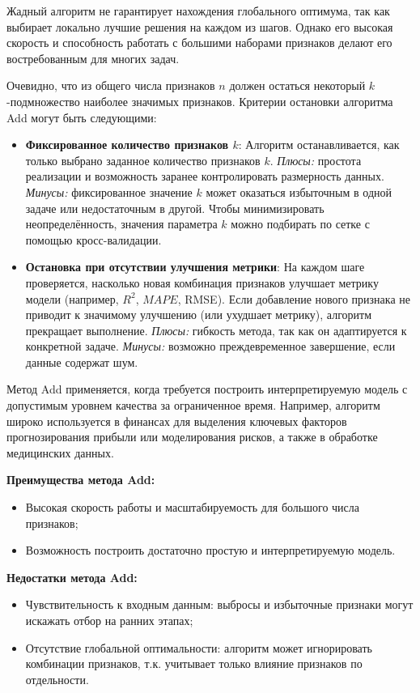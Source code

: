 Жадный алгоритм не гарантирует нахождения глобального оптимума, так как выбирает локально лучшие решения на каждом из шагов. Однако его высокая скорость и способность работать с большими наборами признаков делают его востребованным для многих задач.

Очевидно, что из общего числа признаков $n$ должен остаться некоторый $k$-подмножество наиболее значимых признаков. Критерии остановки алгоритма Add могут быть следующими:

\begin{itemize}
    \item \textbf{Фиксированное количество признаков $k$}:  
    Алгоритм останавливается, как только выбрано заданное количество признаков $k$.  
    \textit{Плюсы:} простота реализации и возможность заранее контролировать размерность данных.  
    \textit{Минусы:} фиксированное значение $k$ может оказаться избыточным в одной задаче или недостаточным в другой. Чтобы минимизировать неопределённость, значения параметра $k$ можно подбирать по сетке с помощью кросс-валидации.
    
    \item \textbf{Остановка при отсутствии улучшения метрики}:  
    На каждом шаге проверяется, насколько новая комбинация признаков улучшает метрику модели (например, \(R^2\), \(MAPE\), RMSE). Если добавление нового признака не приводит к значимому улучшению (или ухудшает метрику), алгоритм прекращает выполнение.  
    \textit{Плюсы:} гибкость метода, так как он адаптируется к конкретной задаче.  
    \textit{Минусы:} возможно преждевременное завершение, если данные содержат шум.
\end{itemize}

Метод Add применяется, когда требуется построить интерпретируемую модель с допустимым уровнем качества за ограниченное время. Например, алгоритм широко используется в финансах для выделения ключевых факторов прогнозирования прибыли или моделирования рисков, а также в обработке медицинских данных. 

\textbf{Преимущества метода Add:}
\begin{itemize}
    \item Высокая скорость работы и масштабируемость для большого числа признаков;
    \item Возможность построить достаточно простую и интерпретируемую модель.
\end{itemize}

\textbf{Недостатки метода Add:}
\begin{itemize}
    \item Чувствительность к входным данным: выбросы и избыточные признаки могут искажать отбор на ранних этапах;
    \item Отсутствие глобальной оптимальности: алгоритм может игнорировать комбинации признаков, т.к. учитывает только влияние признаков по отдельности.
\end{itemize}

